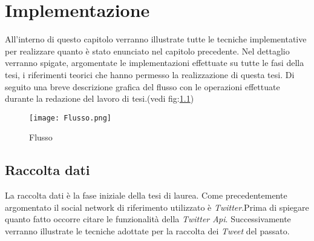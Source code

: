 \chapter{Implementazione}
\label{capitolo5}
\thispagestyle{empty}



\noindent All'interno di questo capitolo verranno illustrate tutte le tecniche implementative per realizzare quanto è stato enunciato nel capitolo precedente. Nel dettaglio verranno spigate, argomentate le implementazioni effettuate su tutte le fasi della tesi, i riferimenti teorici che hanno permesso la realizzazione di questa tesi. Di seguito una breve descrizione grafica del flusso con le operazioni effettuate durante la redazione del lavoro di tesi.(vedi fig:\ref{Flusso})
\begin{figure}[h!]
    \begin{center}
      \texttt{[image: Flusso.png]}
	\caption{Flusso}
	\label{Flusso}
    \end{center}
  \end{figure}

\section{Raccolta dati}
La raccolta dati è la fase iniziale della tesi di laurea. Come precedentemente argomentato il social network di riferimento utilizzato è \textit{Twitter}.Prima di spiegare quanto fatto occorre citare le funzionalità della \textit{Twitter Api}. Successivamente verranno illustrate le tecniche adottate per la raccolta dei \textit{Tweet} del passato.
